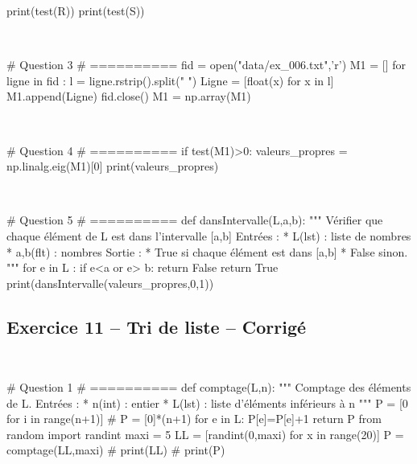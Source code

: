 \documentclass[10pt,fleqn]{article} %
\begin{document}
\begin{multicols}{2}
\begin{corrige}
\begin{python}
print(test(R))
print(test(S))
\end{python}
\end{corrige}

\begin{corrige}
$\quad$
\begin{python}
# Question 3
# ==========
fid = open("data/ex_006.txt",'r')
M1 = []
for ligne in fid :
    l = ligne.rstrip().split(" ")
    Ligne = [float(x) for x in l]
    M1.append(Ligne)
fid.close()
M1 = np.array(M1)
\end{python}
\end{corrige}

\begin{corrige}
$\quad$
\begin{python}
# Question 4
# ==========
if test(M1)>0:
    valeurs_propres = np.linalg.eig(M1)[0]
    print(valeurs_propres)
\end{python}
\end{corrige}

\begin{corrige}
$\quad$
\begin{python}
# Question 5
# ==========
def dansIntervalle(L,a,b):
    """
    Vérifier que chaque élément de L est dans 
    l'intervalle [a,b]
    Entrées : 
     * L(lst) : liste de nombres
     * a,b(flt) : nombres
    Sortie : 
     * True si chaque élément est dans [a,b]
     * False sinon. 
    """   
    for e in L :
        if e<a or e> b:
            return False
    return True
print(dansIntervalle(valeurs_propres,0,1))
\end{python}
\end{corrige}


\subsection*{Exercice 11 -- Tri de liste -- Corrigé}

\begin{corrige}
$\quad$
\begin{python}
# Question 1 
# ==========
def comptage(L,n):
    """
    Comptage des éléments de L.
    Entrées :
     * n(int) : entier
     * L(lst) : liste d'éléments inférieurs à n
    """
    P = [0 for i in range(n+1)]
    # P = [0]*(n+1)
    for e in L:
        P[e]=P[e]+1
    return P
from random import randint
maxi = 5
LL = [randint(0,maxi) for x in range(20)]
P = comptage(LL,maxi)
# print(LL)
# print(P)
\end{python}


\end{corrige}
\end{multicols}
\end{document}
